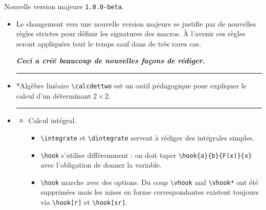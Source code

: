 \documentclass[12pt,a4paper]{book}
\makeatletter
\newcommand\env[1]{\texttt{#1}}
\newcommand\macro[1]{\env{\textbackslash{}#1}}
\theoremstyle{definition}
\newcommand\separation{
	\medskip
	\hfill\rule{0.5\textwidth}{0.75pt}\hfill
	\medskip
}
\newcommand\topic{\@ifstar{\@topic@star}{\@topic@no@star}}
\newcommand\@topic@no@star[1]{%
	\textbf{\textsc{#1}.}%
}
\newcommand\@topic@star[1]{%
	\textbf{\textsc{#1} :}%
}
\makeatother
\begin{document}
{{\begin{description}

    \medskip
    \item[2020-06-21] Nouvelle version majeure \verb+1.0.0-beta+.
    
    \begin{itemize}[itemsep=.5em]
        \item Le changement vers une nouvelle version majeure se justifie par de nouvelles règles strictes pour définir les signatures des macros. À l'avenir ces règles seront appliquées tout le temps sauf dans de très rares cas.
        \begin{center}
    		\bfseries\itshape
    		Ceci a créé beaucoup de nouvelles façons de rédiger.
        \end{center}
    
    
    
    
    
        \separation
        \item \topic*{Algèbre linéaire}
              \macro{calcdettwo} est un outil pédagogique pour expliquer le calcul d'un déterminant $2\times2$.
    
    
    
    
        \separation
        \item \topic{Analyse}
        \begin{itemize}[itemsep=.5em]
            \item Calcul intégral.
            
            \begin{itemize}[itemsep=.5em, label=$\rightarrow$]
                \item \macro{integrate} et \macro{dintegrate} servent à rédiger des intégrales simples.
    
                \item \macro{hook} s'utilise différemment : on doit taper \macro{hook\{a\}\{b\}\{F(x)\}\{x\}} avec l'obligation de donner la variable.
                
                \item \macro{hook} marche avec des options.
                      Du coup \macro{vhook} and \macro{vhook*} ont été supprimées mais les mises en forme correspondantes existent toujours via \macro{hook[r]} et \macro{hook[sr]}.
    	    \end{itemize}
    	    
            

\end{itemize}
\end{itemize}
\end{description}}}
\end{document}
